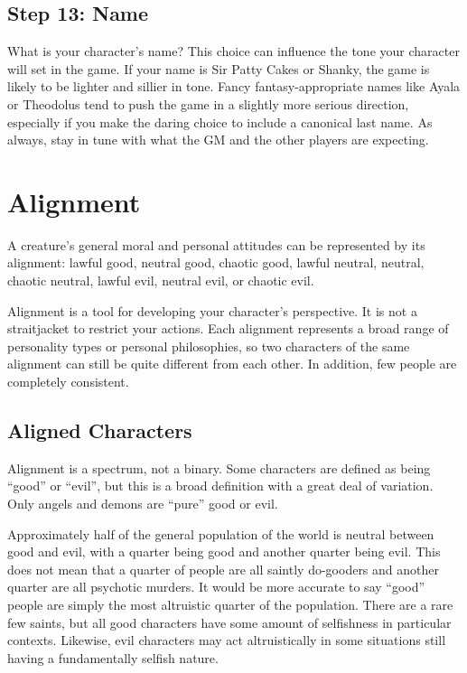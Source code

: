     \subsection{Step 13: Name}
        What is your character's name?
        This choice can influence the tone your character will set in the game.
        If your name is Sir Patty Cakes or Shanky, the game is likely to be lighter and sillier in tone.
        Fancy fantasy-appropriate names like Ayala or Theodolus tend to push the game in a slightly more serious direction, especially if you make the daring choice to include a canonical last name.
        As always, stay in tune with what the GM and the other players are expecting.

\section{Alignment}\label{Alignment}
    A creature's general moral and personal attitudes can be represented by its alignment: lawful good, neutral good, chaotic good, lawful neutral, neutral, chaotic neutral, lawful evil, neutral evil, or chaotic evil.

    Alignment is a tool for developing your character's perspective.
    It is not a straitjacket to restrict your actions.
    Each alignment represents a broad range of personality types or personal philosophies, so two characters of the same alignment can still be quite different from each other.
    In addition, few people are completely consistent.

    \subsection{Aligned Characters}
        Alignment is a spectrum, not a binary.
        Some characters are defined as being ``good'' or ``evil'', but this is a broad definition with a great deal of variation.
        Only angels and demons are ``pure'' good or evil.

        Approximately half of the general population of the world is neutral between good and evil, with a quarter being good and another quarter being evil.
        This does not mean that a quarter of people are all saintly do-gooders and another quarter are all psychotic murders.
        It would be more accurate to say ``good'' people are simply the most altruistic quarter of the population.
        There are a rare few saints, but all good characters have some amount of selfishness in particular contexts.
        Likewise, evil characters may act altruistically in some situations still having a fundamentally selfish nature.

